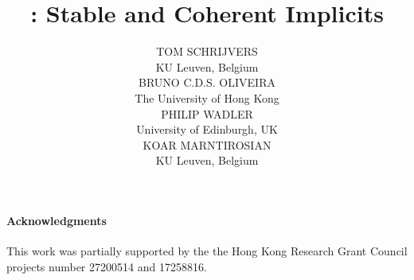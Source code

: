 \documentclass{jfp1}
\title[Cochis: Stable and Coherent Implicits]{\name: Stable and Coherent Implicits}
\author[T. Schrijvers, B. Oliveira, P. Wadler and K. Marntirosian]
       {TOM SCHRIJVERS \\
        KU Leuven, Belgium \\
        BRUNO C.D.S. OLIVEIRA \\
        The University of Hong Kong \\
        PHILIP WADLER \\ 
        University of Edinburgh, UK \\
        KOAR MARNTIROSIAN \\
        KU Leuven, Belgium
}
\begin{document}
\begingroup
\linenumbers

\maketitle

\begin{abstract}

\end{abstract}














%






\paragraph{Acknowledgments}
This work was
partially supported by the the Hong Kong Research Grant Council
projects number 27200514 and 17258816.

\newpage


\newpage
\appendix






\endgroup
\end{document}
